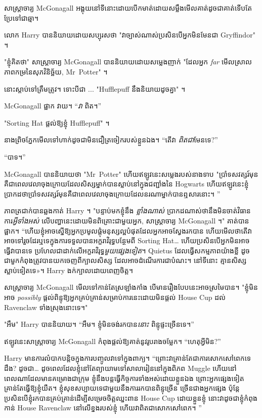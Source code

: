 សាស្រ្តាចារ្យ McGonagall អង្គុយនៅទីនោះដោយបើកមាត់ដោយសម្លឹងមើលគាត់ដូចជាគាត់ទើបតែប្រែទៅជាឆ្មា។

លោក Harry បាននិយាយដោយសប្បុរសថា "វាច្បាស់ណាស់ប្រសិនបើអ្នកមិនមែនជា Gryffindor" ។

"ខ្ញុំគិតថា" សាស្រ្តាចារ្យ McGonagall បាននិយាយដោយសម្លេងញាក់ "ដែលអ្នក \emph{far} មើលស្រាលភាពកម្រនៃសុភវិនិច្ឆ័យ, Mr~Potter" ។

នោះស្តាប់ទៅត្រឹមត្រូវ។ ទោះបីជា ... "Hufflepuff នឹងនិយាយដូចគ្នា" ។

McGonagall ផ្អាក វាយ។ “\emph{វា} ពិត។”

"Sorting Hat ផ្តល់ឱ្យខ្ញុំ Hufflepuff" ។

នាង​ព្រិច​ភ្នែក​មើល​ទៅ​ហាក់​ដូច​ជា​មិន​ជឿ​ត្រចៀក​របស់​ខ្លួន​ឯង។ “តើវា \emph{ពិតជា}មែនទេ?”

“បាទ។”

McGonagall បាននិយាយថា "Mr~Potter" ហើយឥឡូវនេះសម្លេងរបស់នាងទាប "ប្រាំទសវត្សរ៍មុនគឺជាពេលវេលាចុងក្រោយដែលសិស្សម្នាក់បានស្លាប់នៅក្នុងជញ្ជាំងនៃ Hogwarts ហើយឥឡូវនេះខ្ញុំប្រាកដថាប្រាំទសវត្សរ៍មុនគឺជាពេលវេលាចុងក្រោយដែលនរណាម្នាក់បានឮសារនោះ។ ”

ភាពត្រជាក់បានឆ្លងកាត់ Harry ។ "បន្ទាប់មកខ្ញុំនឹង \emph{ខ្លាំងណាស់} ប្រាកដណាស់ថានឹងមិនចាត់វិធានការ\emph{អ្វីទាំងអស់} លើបញ្ហានេះដោយមិនពិគ្រោះជាមួយអ្នក, សាស្រ្តាចារ្យ McGonagall ។" គាត់បានផ្អាក។ “ហើយខ្ញុំអាចស្នើឱ្យអ្នកប្រមូលផ្តុំមនុស្សល្អបំផុតដែលអ្នកអាចស្វែងរកបាន ហើយមើលថាតើវាអាចទៅរួចដែរឬទេក្នុងការទទួលបានអក្ខរាវិរុទ្ធបន្ថែមពី Sorting Hat… ហើយប្រសិនបើអ្នកមិនអាចធ្វើវាបានទេ ប្រហែលជាដាក់លើអក្ខរាវិរុទ្ធ\emph{មួយផ្សេងទៀត}។ Quietus ដែលធ្វើសកម្មភាពយ៉ាងខ្លី ដូចជាមួកកំពុងត្រូវបានយកចេញពីក្បាលសិស្ស ដែលអាចដំណើរការជាបំណះ។ នៅ​ទី​នោះ គ្មាន​សិស្ស​ស្លាប់​ទៀត​ទេ»។ Harry ងក់ក្បាលដោយពេញចិត្ត។

សាស្ត្រាចារ្យ McGonagall មើល​ទៅ​កាន់​តែ​ស្រឡាំងកាំង បើ​មាន​រឿង​បែប​នេះ​អាច​ស្រមៃ​បាន។ "ខ្ញុំមិនអាច \emph{possibly} ផ្តល់ពិន្ទុឱ្យអ្នកគ្រប់គ្រាន់សម្រាប់ការនេះដោយមិនផ្តល់ House Cup ដល់ Ravenclaw ទាំងស្រុងនោះទេ។"

"អឹម" Harry បាននិយាយ។ “អឹម។ ខ្ញុំមិនចង់រកបាន\emph{នោះ} ពិន្ទុផ្ទះច្រើនទេ។”

ឥឡូវនេះសាស្រ្តាចារ្យ McGonagall កំពុងផ្តល់ឱ្យគាត់នូវរូបរាងចម្លែក។ “ហេតុអ្វីមិន?”

Harry មានការលំបាកបន្តិចក្នុងការបញ្ចូលវាទៅក្នុងពាក្យ។ “ព្រោះវាគ្រាន់តែជាការសោកសៅពេកទេដឹង? ដូចជា… ដូចពេលដែលខ្ញុំនៅតែព្យាយាមទៅសាលារៀននៅក្នុងពិភព Muggle ហើយនៅពេលណាដែលមានគម្រោងជាក្រុម ខ្ញុំនឹងបន្តធ្វើកិច្ចការទាំងអស់ដោយខ្លួនឯង ព្រោះអ្នកផ្សេងទៀតគ្រាន់តែធ្វើឱ្យខ្ញុំយឺត។ ខ្ញុំសុខសប្បាយទេជាមួយនឹងការរកបានពិន្ទុច្រើន ច្រើនជាងអ្នកផ្សេង ប៉ុន្តែប្រសិនបើខ្ញុំរកបានគ្រប់គ្រាន់ដើម្បីសម្រេចចិត្តឈ្នះពាន House Cup ដោយខ្លួនខ្ញុំ នោះវាដូចជាខ្ញុំកំពុងកាន់ House Ravenclaw នៅលើខ្នងរបស់ខ្ញុំ ហើយវាពិតជាសោកសៅពេក។ ”

